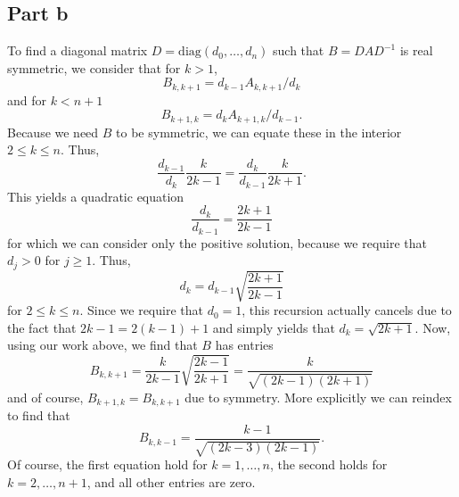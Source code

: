 \documentclass{article}
\begin{document}
\subsection{Part b}
To find a diagonal matrix $D=\text{diag}(d_0,\ldots,d_n)$ such that $B=DAD^{-1}$ is real symmetric, we consider that for $k>1$, 
\[
B_{k,k+1} = d_{k-1}A_{k,k+1}/d_k
\]
and for $k<n+1$
\[
B_{k+1,k} = d_{k}A_{k+1,k}/d_{k-1}.
\]
Because we need $B$ to be symmetric, we can equate these in the interior $2\leq k\leq n$. Thus, 
\[
\frac{d_{k-1}}{d_k}\frac{k}{2k-1}=\frac{d_{k}}{d_{k-1}}\frac{k}{2k+1}.
\]
This yields a quadratic equation 
\[
\frac{d_{k}}{d_{k-1}}=\frac{2k+1}{2k-1}
\]
for which we can consider only the positive solution, because we require that $d_j>0$ for $j\geq1$. Thus,
\[
d_k=d_{k-1}\sqrt{\frac{2k+1}{2k-1}}
\]
for $2\leq k\leq n$. Since we require that $d_0=1$, this recursion actually cancels due to the fact that $2k-1=2(k-1)+1$ and simply yields that $d_k=\sqrt{2k+1}$. Now, using our work above, we find that $B$ has entries 
\[
B_{k,k+1}=\frac{k}{2k-1}\sqrt{\frac{2k-1}{2k+1}}=\frac{k}{\sqrt{(2k-1)(2k+1)}}
\]
and of course, $B_{k+1,k}=B_{k,k+1}$ due to symmetry. More explicitly we can reindex to find that 
\[
B_{k,k-1}=\frac{k-1}{\sqrt{(2k-3)(2k-1)}}.
\]
Of course, the first equation hold for $k=1,\ldots,n$, the second holds for $k=2,\ldots,n+1$, and all other entries are zero. 
\end{document}
